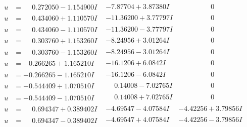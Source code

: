 \documentclass[1p]{elsarticle_modified}
\theoremstyle{definition}
\begin{document}
$$\begin{array}{c|c|c}
\begin{aligned}
u &= \phantom{-}0.272050 - 1.154900 I\end{aligned}
 & -7.87704 + 3.87380 I & \phantom{-0.000000 } 0 \\ \hline\begin{aligned}
u &= \phantom{-}0.434060 + 1.110570 I\end{aligned}
 & -11.36200 + 3.77797 I & \phantom{-0.000000 } 0 \\ \hline\begin{aligned}
u &= \phantom{-}0.434060 - 1.110570 I\end{aligned}
 & -11.36200 - 3.77797 I & \phantom{-0.000000 } 0 \\ \hline\begin{aligned}
u &= \phantom{-}0.303760 + 1.153260 I\end{aligned}
 & -8.24956 + 3.01264 I & \phantom{-0.000000 } 0 \\ \hline\begin{aligned}
u &= \phantom{-}0.303760 - 1.153260 I\end{aligned}
 & -8.24956 - 3.01264 I & \phantom{-0.000000 } 0 \\ \hline\begin{aligned}
u &= -0.266265 + 1.165210 I\end{aligned}
 & -16.1206 + 6.0842 I & \phantom{-0.000000 } 0 \\ \hline\begin{aligned}
u &= -0.266265 - 1.165210 I\end{aligned}
 & -16.1206 - 6.0842 I & \phantom{-0.000000 } 0 \\ \hline\begin{aligned}
u &= -0.544409 + 1.070510 I\end{aligned}
 & \phantom{-}0.14008 - 7.02765 I & \phantom{-0.000000 } 0 \\ \hline\begin{aligned}
u &= -0.544409 - 1.070510 I\end{aligned}
 & \phantom{-}0.14008 + 7.02765 I & \phantom{-0.000000 } 0 \\ \hline\begin{aligned}
u &= \phantom{-}0.694347 + 0.389402 I\end{aligned}
 & -4.69547 - 4.07584 I & -4.42256 + 3.79856 I \\ \hline\begin{aligned}
u &= \phantom{-}0.694347 - 0.389402 I\end{aligned}
 & -4.69547 + 4.07584 I & -4.42256 - 3.79856 I \\ \hline\begin{aligned}

\end{aligned}
\end{array}$$
\end{document}
